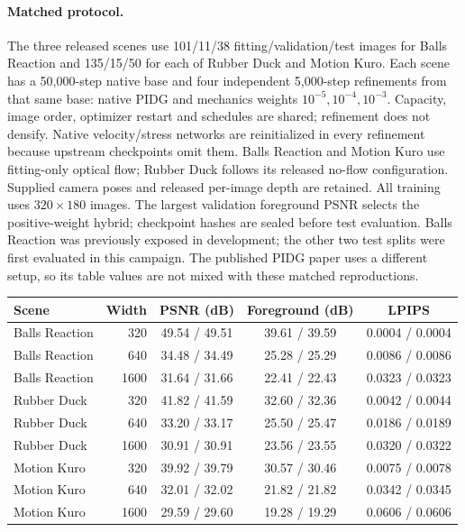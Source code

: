 \paragraph{Matched protocol.}
The three released scenes use 101/11/38 fitting/validation/test images for Balls Reaction and 135/15/50 for each of Rubber Duck and Motion Kuro. Each scene has a 50,000-step native base and four independent 5,000-step refinements from that same base: native PIDG and mechanics weights $10^{-5},10^{-4},10^{-3}$. Capacity, image order, optimizer restart and schedules are shared; refinement does not densify. Native velocity/stress networks are reinitialized in every refinement because upstream checkpoints omit them. Balls Reaction and Motion Kuro use fitting-only optical flow; Rubber Duck follows its released no-flow configuration. Supplied camera poses and released per-image depth are retained. All training uses $320\times180$ images. The largest validation foreground PSNR selects the positive-weight hybrid; checkpoint hashes are sealed before test evaluation. Balls Reaction was previously exposed in development; the other two test splits were first evaluated in this campaign. The published PIDG paper uses a different setup, so its table values are not mixed with these matched reproductions.

\begin{center}\begin{minipage}{\textwidth}
\label{tab:pidg-dense}
\centering\small
\begin{tabular}{lrccc}\toprule
Scene & Width & PSNR (dB) & Foreground (dB) & LPIPS \\\midrule
Balls Reaction & 320 & 49.54 / 49.51 & 39.61 / 39.59 & 0.0004 / 0.0004 \\
Balls Reaction & 640 & 34.48 / 34.49 & 25.28 / 25.29 & 0.0086 / 0.0086 \\
Balls Reaction & 1600 & 31.64 / 31.66 & 22.41 / 22.43 & 0.0323 / 0.0323 \\
Rubber Duck & 320 & 41.82 / 41.59 & 32.60 / 32.36 & 0.0042 / 0.0044 \\
Rubber Duck & 640 & 33.20 / 33.17 & 25.50 / 25.47 & 0.0186 / 0.0189 \\
Rubber Duck & 1600 & 30.91 / 30.91 & 23.56 / 23.55 & 0.0320 / 0.0322 \\
Motion Kuro & 320 & 39.92 / 39.79 & 30.57 / 30.46 & 0.0075 / 0.0078 \\
Motion Kuro & 640 & 32.01 / 32.02 & 21.82 / 21.82 & 0.0342 / 0.0345 \\
Motion Kuro & 1600 & 29.59 / 29.60 & 19.28 / 19.29 & 0.0606 / 0.0606 \\
\bottomrule\end{tabular}\end{minipage}\end{center}

